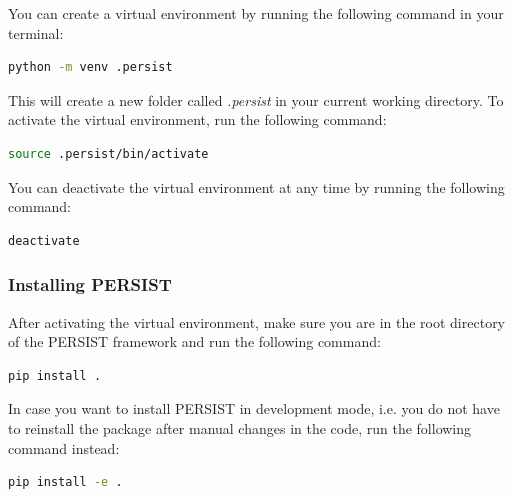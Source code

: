 \documentclass[
	a4paper, %
	12pt, %
]{persist}
\begin{document}
You can create a virtual environment by running the following command in your terminal:

\begin{lstlisting}[language=bash]
	python -m venv .persist
\end{lstlisting}

This will create a new folder called \emph{.persist} in your current working directory. To activate the virtual environment, run the following command:

\begin{lstlisting}[language=bash]
	source .persist/bin/activate
\end{lstlisting}

You can deactivate the virtual environment at any time by running the following command:

\begin{lstlisting}[language=bash]
	deactivate
\end{lstlisting}

\subsubsection{Installing PERSIST}

After activating the virtual environment, make sure you are in the root directory of the PERSIST framework and run the following command:

\begin{lstlisting}[language=bash]
	pip install .
\end{lstlisting}

In case you want to install PERSIST in development mode, i.e. you do not have to reinstall the package after manual changes in the code, run the following command instead:

\begin{lstlisting}[language=bash]
	pip install -e .
\end{lstlisting}
\end{document}
